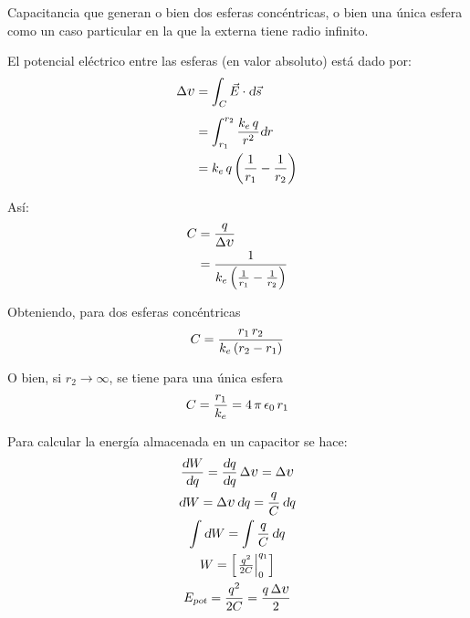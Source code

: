 \begin{mdframed}[style=ExampleFrame]
    \begin{example}
    \end{example}
    \begin{formatI}
        Capacitancia que generan o bien dos esferas concéntricas, o bien una única esfera como un caso particular en la que la externa tiene radio infinito.
    \end{formatI}
    El potencial eléctrico entre las esferas (en valor absoluto) está dado por:
    \begin{align*}
        \Delta \voltage &= \int_C \vec{E} \cdot \dif \vec{s}
        \\[1ex]
        &= \int_{r_1}^{r_2} \frac{\cstcoulomb \, q}{r^2} \dif r
        \\
        &= \cstcoulomb \, q \inParentheses{\frac{1}{r_1} - \frac{1}{r_2}}
    \end{align*}

    Así:
    \begin{align*}
        C &= \frac{q}{\Delta \voltage}
        \\
        &= \frac{1}{\cstcoulomb \inParentheses{\frac{1}{r_1} - \frac{1}{r_2}}}
    \end{align*}

    Obteniendo, para dos esferas concéntricas
    \begin{equation*}
        C = \frac{r_1 \, r_2}{k_e \left(r_2 - r_1\right)}
    \end{equation*}

    O bien, si $r_2 \to \infty$, se tiene para una única esfera
    \begin{equation*}
        C = \frac{r_1}{k_e} = 4 \, \pi \, \epsilon_0 \, r_1
    \end{equation*}
\end{mdframed}

Para calcular la energía almacenada en un capacitor se hace:
\begin{gather*}
    \frac{\dif W}{\dif q} = \frac{\dif q}{\dif q} \, \Delta \voltage = \Delta \voltage
    \\
    \dif W = \Delta \voltage \, \dif q = \frac{q}{C} \, \dif q
    \\
    \int \dif W = \int \frac{q}{C} \, \dif q
    \\
    W = \barrow{\frac{q^2}{2C}}{0}{q_1}
    \\
    \sub{E}{pot} = \frac{q^2}{2C} = \frac{q \, \Delta \voltage}{2}
\end{gather*}

